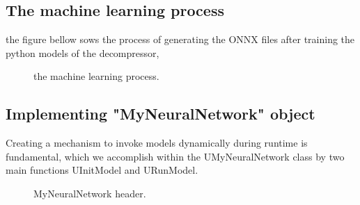 \documentclass[12pt]{book}
\begin{document}
\subsection{The machine learning process}
the figure bellow sows the process of generating the ONNX files after training the python models of the decompressor,
\begin{figure}[!h]
    \centering
    \caption{the machine learning process.}
\end{figure}

\subsection{Implementing "MyNeuralNetwork" object}
Creating a mechanism to invoke models dynamically during runtime is fundamental, which we accomplish within the UMyNeuralNetwork class by two main functions UInitModel and URunModel.

   \begin{figure}[!h]
    \centering
    \caption{MyNeuralNetwork header.}
   \end{figure}
   
\end{document}

